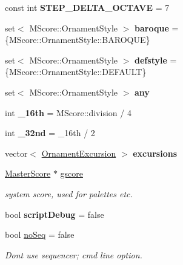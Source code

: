 \begin{DoxyCompactItemize}
const int {\bfseries S\+T\+E\+P\+\_\+\+D\+E\+L\+T\+A\+\_\+\+O\+C\+T\+A\+VE} = 7
\item 
\mbox{\label{namespace_ms_aa06cc5dbf93f45890ffb983f8d5d71ab}} 
set$<$ M\+Score\+::\+Ornament\+Style $>$ {\bfseries baroque} = \{M\+Score\+::\+Ornament\+Style\+::\+B\+A\+R\+O\+Q\+UE\}
\item 
\mbox{\label{namespace_ms_abaffdcfe646b3923d1b4750ed59339da}} 
set$<$ M\+Score\+::\+Ornament\+Style $>$ {\bfseries defstyle} = \{M\+Score\+::\+Ornament\+Style\+::\+D\+E\+F\+A\+U\+LT\}
\item 
\mbox{\label{namespace_ms_a8e3db5fafc8c6d736aa639bd585a00af}} 
set$<$ M\+Score\+::\+Ornament\+Style $>$ {\bfseries any}
\item 
\mbox{\label{namespace_ms_aa7bafbe9e13e3c67a034e1d27bf908db}} 
int {\bfseries \+\_\+16th} = M\+Score\+::division / 4
\item 
\mbox{\label{namespace_ms_a32b7aa9646def928820a2e382c34ebb5}} 
int {\bfseries \+\_\+32nd} = \+\_\+16th / 2
\item 
vector$<$ \hyperlink{struct_ms_1_1_ornament_excursion}{Ornament\+Excursion} $>$ {\bfseries excursions}
\item 
\mbox{\label{namespace_ms_aba2aa505eb62a6a5600a3e55f0cc11eb}} 
\hyperlink{class_ms_1_1_master_score}{Master\+Score} $\ast$ \hyperlink{namespace_ms_aba2aa505eb62a6a5600a3e55f0cc11eb}{gscore}
\begin{DoxyCompactList}\small\item\em system score, used for palettes etc. \end{DoxyCompactList}\item 
\mbox{\label{namespace_ms_ac8640214e99f803fc7f7694eb9645c11}} 
bool {\bfseries script\+Debug} = false
\item 
\mbox{\label{namespace_ms_a4f96a5c06061337a0d971bf4d057e31a}} 
bool \hyperlink{namespace_ms_a4f96a5c06061337a0d971bf4d057e31a}{no\+Seq} = false
\begin{DoxyCompactList}\small\item\em Dont use sequencer; cmd line option. \end{DoxyCompactList}\item 

\end{DoxyCompactItemize}

